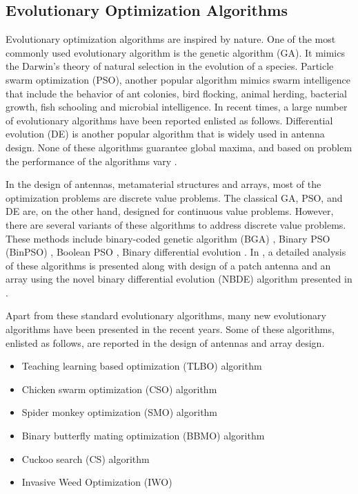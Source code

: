 \subsection{Evolutionary Optimization Algorithms}
Evolutionary optimization algorithms are inspired by nature. One of the most commonly used evolutionary algorithm is the genetic algorithm (GA). It mimics the Darwin's theory of natural selection in the evolution of a species. Particle swarm optimization (PSO), another popular algorithm mimics swarm intelligence that include the behavior of ant colonies, bird flocking, animal herding, bacterial growth, fish schooling and microbial intelligence. In recent times, a large number of evolutionary algorithms have been reported enlisted as follows. Differential evolution (DE) is another popular algorithm that is widely used in antenna design. None of these algorithms guarantee global maxima, and based on problem the performance of the algorithms vary \cite{compCAD4Arry}.

In the design of antennas, metamaterial structures and arrays, most of the optimization problems are discrete value problems. The classical GA, PSO, and DE are, on the other hand, designed for continuous value problems. However, there are several variants of these algorithms to address discrete value problems. These methods include binary-coded genetic algorithm (BGA) \cite{optAlgBGAbook, optAlgEMbook}, Binary PSO (BinPSO) \cite{optAlgBPSO}, Boolean PSO \cite{arraySynth1, OptAlgBoolPSO4Ant}, Binary differential evolution \cite{optAlgBinDE, optAlgModBinDE}. In \cite{optAlgDE4AntennaRev}, a detailed analysis of these algorithms is presented along with design of a patch antenna and an array using the novel binary differential evolution (NBDE) algorithm presented in \cite{optAlgModBinDE}. 

Apart from these standard evolutionary algorithms, many new evolutionary algorithms have been presented in the recent years. Some of these algorithms, enlisted as follows, are reported in the design of antennas and array design.

\begin{itemize}
\item Teaching learning based optimization (TLBO) algorithm \cite{arraySynth3}
\item Chicken swarm optimization (CSO) algorithm \cite{arraySynth4}
\item Spider monkey optimization (SMO) algorithm \cite{arrayThin1}
\item Binary butterfly mating optimization (BBMO) algorithm \cite{arrayThin2}
\item Cuckoo search (CS) algorithm \cite{CuckooSerach}
\item Invasive Weed Optimization (IWO) \cite{InvasiveWeed}
\end{itemize}

